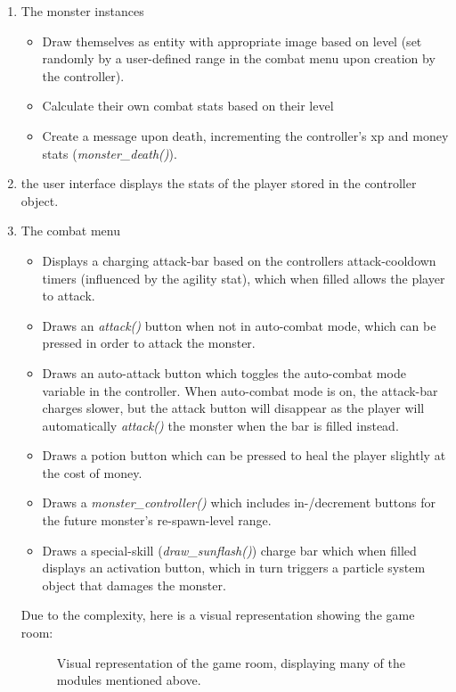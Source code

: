 \documentclass[12pt]{report}
\begin{document}
\begin{enumerate}
\begin{enumerate}
\item The monster instances 
\begin{itemize}
\item Draw themselves as entity with appropriate image based on level (set randomly by a user-defined range in the combat menu upon creation by the controller).
\item Calculate their own combat stats based on their level
\item Create a message upon death, incrementing the controller's xp and money stats (\textsl{monster\_death()}).
\end{itemize}
\item the user interface displays the stats of the player stored in the controller object.
\item The combat menu
\begin{itemize}
\item Displays a charging attack-bar based on the controllers attack-cooldown timers (influenced by the agility stat), which when filled allows the player to attack.
\item Draws an \textsl{attack()} button when not in auto-combat mode, which can be pressed in order to attack the monster.
\item Draws an auto-attack button which toggles the auto-combat mode variable in the controller. When auto-combat mode is on, the attack-bar charges slower, but the attack button will disappear as the player will automatically \textsl{attack()} the monster when the bar is filled instead.
\item Draws a potion button which can be pressed to heal the player slightly at the cost of money.
\item Draws a \textsl{monster\_controller()} which includes in-/decrement buttons for the future monster's re-spawn-level range.
\item Draws a special-skill (\textsl{draw\_sunflash()}) charge bar which when filled displays an activation button, which in turn triggers a particle system object that damages the monster.
\end{itemize}
Due to the complexity, here is a visual representation showing the game room:

\begin{figure}[h]
\centering
{}
\caption{Visual representation of the game room, displaying many of the modules mentioned above.}
\end{figure}


\end{enumerate}
\end{enumerate}
\end{document}
